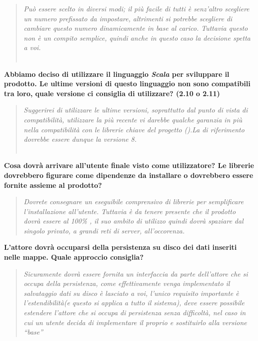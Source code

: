 \documentclass{scalatekids-article}
\begin{document}
\begin{quote}
  \textit{Può essere scelto in diversi modi; il più facile di tutti è senz'altro scegliere un numero prefissato da impostare, altrimenti si potrebbe scegliere di cambiare questo numero dinamicamente in base al carico. Tuttavia questo non è un compito semplice, quindi anche in questo caso la decisione spetta a voi.\\ \\}
\end{quote}
\textbf{Abbiamo deciso di utilizzare il linguaggio \textit{Scala} per sviluppare il prodotto. Le ultime versioni di questo linguaggio non sono compatibili tra loro, quale versione ci consiglia di utilizzare? (2.10 o 2.11)}
\begin{quote}
  \textit{Suggerirei di utilizzare le ultime versioni, soprattutto dal punto di
    vista di compatibilità, utilizzare la  più recente vi darebbe qualche
    garanzia in più nella compatibilità con le librerie chiave del progetto
    ().La  di riferimento dovrebbe essere dunque la
    versione 8.\\ \\}
\end{quote}
\textbf{Cosa dovrà arrivare all'utente finale visto come utilizzatore? Le librerie  dovrebbero figurare come dipendenze da installare o dovrebbero essere fornite assieme al prodotto?}
\begin{quote}
  \textit{Dovrete consegnare un eseguibile comprensivo di librerie
     per semplificare l'installazione all'utente. Tuttavia è da
    tenere presente che il prodotto dovrà essere al 100\% , il suo ambito di utilizzo quindi dovrà spaziare dal singolo
    privato, a grandi reti di server, all'occorenza.}
\end{quote}
\textbf{L'attore  dovrà occuparsi della persistenza su disco dei dati inseriti nelle mappe. Quale approccio consiglia?}
\begin{quote}
  \textit{Sicuramente dovrà essere fornita un interfaccia da parte dell'attore
    che si occupa della persistenza, come effettivamente venga implementato il
    salvataggio dati su disco è lasciato a voi, l'unico requisito importante è
    l'estendibilità(e questo si applica a tutto il sistema), deve essere
    possibile estendere l'attore che si occupa di persistenza senza difficoltà,
    nel caso in cui un utente decida di implementare il proprio
     e sostituirlo alla versione ``base''}
\end{quote}
\end{document}
